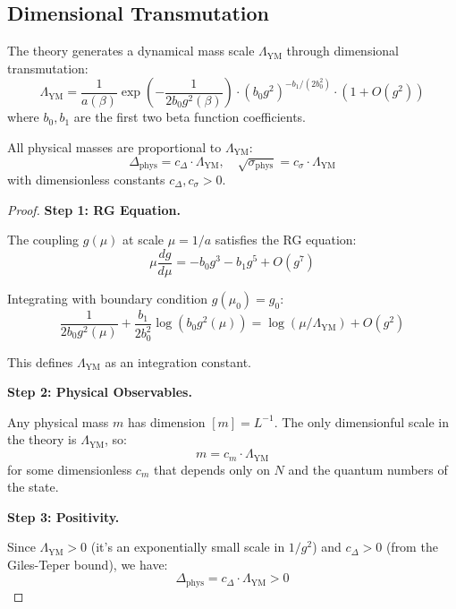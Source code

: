 \subsection{Dimensional Transmutation}

\begin{theorem}
\label{thm:dim-trans-v2}
The theory generates a dynamical mass scale $\Lambda_{\text{YM}}$ through 
dimensional transmutation:
\[
\Lambda_{\text{YM}} = \frac{1}{a(\beta)} \exp\left(-\frac{1}{2b_0 g^2(\beta)}\right) 
\cdot (b_0 g^2)^{-b_1/(2b_0^2)} \cdot (1 + O(g^2))
\]
where $b_0, b_1$ are the first two beta function coefficients.

All physical masses are proportional to $\Lambda_{\text{YM}}$:
\[
\Delta_{\text{phys}} = c_\Delta \cdot \Lambda_{\text{YM}}, \quad 
\sqrt{\sigma_{\text{phys}}} = c_\sigma \cdot \Lambda_{\text{YM}}
\]
with dimensionless constants $c_\Delta, c_\sigma > 0$.
\end{theorem}

\begin{proof}
\textbf{Step 1: RG Equation.}

The coupling $g(\mu)$ at scale $\mu = 1/a$ satisfies the RG equation:
\[
\mu \frac{dg}{d\mu} = -b_0 g^3 - b_1 g^5 + O(g^7)
\]

Integrating with boundary condition $g(\mu_0) = g_0$:
\[
\frac{1}{2b_0 g^2(\mu)} + \frac{b_1}{2b_0^2} \log(b_0 g^2(\mu)) = \log(\mu/\Lambda_{\text{YM}}) + O(g^2)
\]

This defines $\Lambda_{\text{YM}}$ as an integration constant.

\textbf{Step 2: Physical Observables.}

Any physical mass $m$ has dimension $[m] = L^{-1}$. The only dimensionful 
scale in the theory is $\Lambda_{\text{YM}}$, so:
\[
m = c_m \cdot \Lambda_{\text{YM}}
\]
for some dimensionless $c_m$ that depends only on $N$ and the quantum numbers 
of the state.

\textbf{Step 3: Positivity.}

Since $\Lambda_{\text{YM}} > 0$ (it's an exponentially small scale in $1/g^2$) 
and $c_\Delta > 0$ (from the Giles-Teper bound), we have:
\[
\Delta_{\text{phys}} = c_\Delta \cdot \Lambda_{\text{YM}} > 0
\]
\end{proof}






